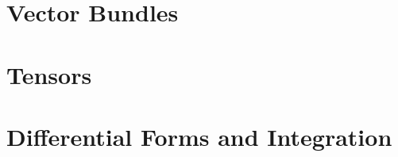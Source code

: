 \documentclass{kumikoNotes}
\begin{document}
\chapter{Vector Bundles}
    
    

\chapter{Tensors}
    
    
\chapter{Differential Forms and Integration}
    
    
    
    
    
    
\appendix

%
\end{document}
